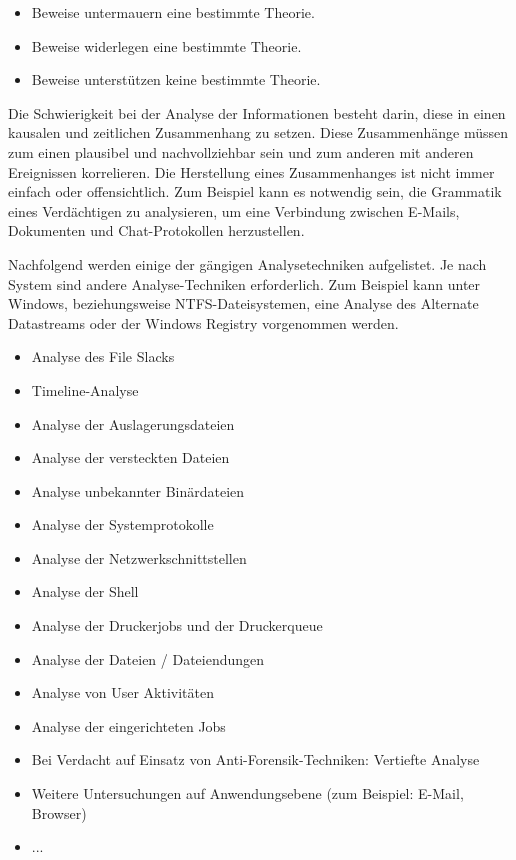 \begin{itemize}
\item Beweise untermauern eine bestimmte Theorie.
\item Beweise widerlegen eine bestimmte Theorie.
\item Beweise unterstützen keine bestimmte Theorie.
\end{itemize}

Die Schwierigkeit bei der Analyse der Informationen besteht darin, diese in einen kausalen und zeitlichen Zusammenhang zu setzen. Diese Zusammenhänge müssen zum einen plausibel und nachvollziehbar sein und zum anderen mit anderen Ereignissen korrelieren. Die Herstellung eines Zusammenhanges ist nicht immer einfach oder offensichtlich.  Zum Beispiel kann es notwendig sein, die Grammatik eines Verdächtigen zu analysieren, um eine Verbindung zwischen E-Mails, Dokumenten und Chat-Protokollen herzustellen.

Nachfolgend werden einige der gängigen Analysetechniken aufgelistet. Je nach System sind andere Analyse-Techniken erforderlich. Zum Beispiel kann unter Windows, beziehungsweise NTFS-Dateisystemen, eine Analyse des Alternate Datastreams oder der Windows Registry vorgenommen werden.

\begin{itemize}
\item Analyse des File Slacks
\item Timeline-Analyse
\item Analyse der Auslagerungsdateien
\item Analyse der versteckten Dateien
\item Analyse unbekannter Binärdateien
\item Analyse der Systemprotokolle
\item Analyse der Netzwerkschnittstellen
\item Analyse der Shell
\item Analyse der Druckerjobs und der Druckerqueue
\item Analyse der Dateien / Dateiendungen
\item Analyse von User Aktivitäten
\item Analyse der eingerichteten Jobs
\item Bei Verdacht auf Einsatz von Anti-Forensik-Techniken: Vertiefte Analyse
\item Weitere Untersuchungen auf Anwendungsebene (zum Beispiel: E-Mail, Browser)
\item ...
\end{itemize}

